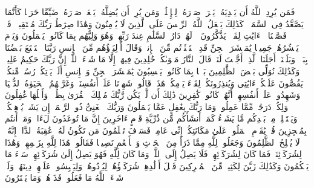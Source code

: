 \stopbuffer%
\startbuffer[\q:6:125]
فَمَن یُرِدِ ٱللَّهُ أَن یَهۡدِیَهُۥ یَشۡرَحۡ صَدۡرَهُۥ لِلۡإِسۡلَٰمِۖ وَمَن یُرِدۡ أَن یُضِلَّهُۥ یَجۡعَلۡ صَدۡرَهُۥ ضَیِّقًا حَرَجࣰا كَأَنَّمَا یَصَّعَّدُ فِی ٱلسَّمَاۤءِۚ كَذَٰلِكَ یَجۡعَلُ ٱللَّهُ ٱلرِّجۡسَ عَلَى ٱلَّذِینَ لَا یُؤۡمِنُونَ%
\stopbuffer%
\startbuffer[\q:6:126]
وَهَٰذَا صِرَٰطُ رَبِّكَ مُسۡتَقِیمࣰاۗ قَدۡ فَصَّلۡنَا ٱلۡءَایَٰتِ لِقَوۡمࣲ یَذَّكَّرُونَ%
\stopbuffer%
\startbuffer[\q:6:127]
۞ لَهُمۡ دَارُ ٱلسَّلَٰمِ عِندَ رَبِّهِمۡۖ وَهُوَ وَلِیُّهُم بِمَا كَانُوا۟ یَعۡمَلُونَ%
\stopbuffer%
\startbuffer[\q:6:128]
وَیَوۡمَ یَحۡشُرُهُمۡ جَمِیعࣰا یَٰمَعۡشَرَ ٱلۡجِنِّ قَدِ ٱسۡتَكۡثَرۡتُم مِّنَ ٱلۡإِنسِۖ وَقَالَ أَوۡلِیَاۤؤُهُم مِّنَ ٱلۡإِنسِ رَبَّنَا ٱسۡتَمۡتَعَ بَعۡضُنَا بِبَعۡضࣲ وَبَلَغۡنَاۤ أَجَلَنَا ٱلَّذِیۤ أَجَّلۡتَ لَنَاۚ قَالَ ٱلنَّارُ مَثۡوَىٰكُمۡ خَٰلِدِینَ فِیهَاۤ إِلَّا مَا شَاۤءَ ٱللَّهُۗ إِنَّ رَبَّكَ حَكِیمٌ عَلِیمࣱ%
\stopbuffer%
\startbuffer[\q:6:129]
وَكَذَٰلِكَ نُوَلِّی بَعۡضَ ٱلظَّٰلِمِینَ بَعۡضَۢا بِمَا كَانُوا۟ یَكۡسِبُونَ%
\stopbuffer%
\startbuffer[\q:6:130]
یَٰمَعۡشَرَ ٱلۡجِنِّ وَٱلۡإِنسِ أَلَمۡ یَأۡتِكُمۡ رُسُلࣱ مِّنكُمۡ یَقُصُّونَ عَلَیۡكُمۡ ءَایَٰتِی وَیُنذِرُونَكُمۡ لِقَاۤءَ یَوۡمِكُمۡ هَٰذَاۚ قَالُوا۟ شَهِدۡنَا عَلَىٰۤ أَنفُسِنَاۖ وَغَرَّتۡهُمُ ٱلۡحَیَوٰةُ ٱلدُّنۡیَا وَشَهِدُوا۟ عَلَىٰۤ أَنفُسِهِمۡ أَنَّهُمۡ كَانُوا۟ كَٰفِرِینَ%
\stopbuffer%
\startbuffer[\q:6:131]
ذَٰلِكَ أَن لَّمۡ یَكُن رَّبُّكَ مُهۡلِكَ ٱلۡقُرَىٰ بِظُلۡمࣲ وَأَهۡلُهَا غَٰفِلُونَ%
\stopbuffer%
\startbuffer[\q:6:132]
وَلِكُلࣲّ دَرَجَٰتࣱ مِّمَّا عَمِلُوا۟ۚ وَمَا رَبُّكَ بِغَٰفِلٍ عَمَّا یَعۡمَلُونَ%
\stopbuffer%
\startbuffer[\q:6:133]
وَرَبُّكَ ٱلۡغَنِیُّ ذُو ٱلرَّحۡمَةِۚ إِن یَشَأۡ یُذۡهِبۡكُمۡ وَیَسۡتَخۡلِفۡ مِنۢ بَعۡدِكُم مَّا یَشَاۤءُ كَمَاۤ أَنشَأَكُم مِّن ذُرِّیَّةِ قَوۡمٍ ءَاخَرِینَ%
\stopbuffer%
\startbuffer[\q:6:134]
إِنَّ مَا تُوعَدُونَ لَءَاتࣲۖ وَمَاۤ أَنتُم بِمُعۡجِزِینَ%
\stopbuffer%
\startbuffer[\q:6:135]
قُلۡ یَٰقَوۡمِ ٱعۡمَلُوا۟ عَلَىٰ مَكَانَتِكُمۡ إِنِّی عَامِلࣱۖ فَسَوۡفَ تَعۡلَمُونَ مَن تَكُونُ لَهُۥ عَٰقِبَةُ ٱلدَّارِۚ إِنَّهُۥ لَا یُفۡلِحُ ٱلظَّٰلِمُونَ%
\stopbuffer%
\startbuffer[\q:6:136]
وَجَعَلُوا۟ لِلَّهِ مِمَّا ذَرَأَ مِنَ ٱلۡحَرۡثِ وَٱلۡأَنۡعَٰمِ نَصِیبࣰا فَقَالُوا۟ هَٰذَا لِلَّهِ بِزَعۡمِهِمۡ وَهَٰذَا لِشُرَكَاۤئِنَاۖ فَمَا كَانَ لِشُرَكَاۤئِهِمۡ فَلَا یَصِلُ إِلَى ٱللَّهِۖ وَمَا كَانَ لِلَّهِ فَهُوَ یَصِلُ إِلَىٰ شُرَكَاۤئِهِمۡۗ سَاۤءَ مَا یَحۡكُمُونَ%
\stopbuffer%
\startbuffer[\q:6:137]
وَكَذَٰلِكَ زَیَّنَ لِكَثِیرࣲ مِّنَ ٱلۡمُشۡرِكِینَ قَتۡلَ أَوۡلَٰدِهِمۡ شُرَكَاۤؤُهُمۡ لِیُرۡدُوهُمۡ وَلِیَلۡبِسُوا۟ عَلَیۡهِمۡ دِینَهُمۡۖ وَلَوۡ شَاۤءَ ٱللَّهُ مَا فَعَلُوهُۖ فَذَرۡهُمۡ وَمَا یَفۡتَرُونَ%

